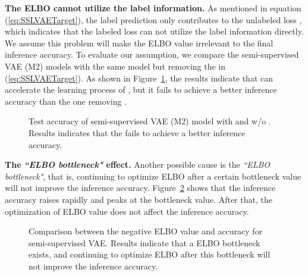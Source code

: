 \documentclass[letterpaper]{article}
\begin{document}
\textbf{The ELBO cannot utilize the label information.} As mentioned in equation (\ref{eq:SSLVAETarget}), the label prediction  only contributes to the unlabeled loss , which indicates that the labeled loss  can not utilize the label information directly. We assume this problem will make the ELBO value irrelevant to the final inference accuracy. To evaluate our assumption, we compare the semi-supervised VAE (M2) models \citep{DBLP:conf/nips/KingmaMRW14} with the same model but removing the  in (\ref{eq:SSLVAETarget}). As shown in Figure~\ref{fig:frozen-ELBO}, the results indicate that  can accelerate the learning process of , but it fails to achieve a better inference accuracy than the one removing . 

\begin{figure}[h]
\centering
{}
\vspace{-0.15cm}
\caption{Test accuracy of semi-supervised VAE (M2) model with and w/o . Results indicates that the  fails to achieve a better inference accuracy. }
\vspace{-0.15cm}
\label{fig:frozen-ELBO}
\end{figure}

\textbf{The} \textbf{\textit{``ELBO bottleneck"} effect.} Another possible cause is the \textit{``ELBO bottleneck"}, that is, continuing to optimize ELBO after a certain bottleneck value will not improve the inference accuracy. Figure~\ref{fig:ELBO-Accuracy-Comparison} shows that the inference accuracy raises rapidly and peaks at the bottleneck value. After that, the optimization of ELBO value does not affect the inference accuracy. 
\begin{figure}[h]
\centering
{}
\vspace{-0.15cm}
\caption{Comparison between the negative ELBO value and accuracy for semi-supervised VAE. Results indicate that a ELBO bottleneck exists, and continuing to optimize ELBO after this bottleneck will not improve the inference accuracy.}
\vspace{-0.15cm}
\label{fig:ELBO-Accuracy-Comparison}
\end{figure}
\end{document}

